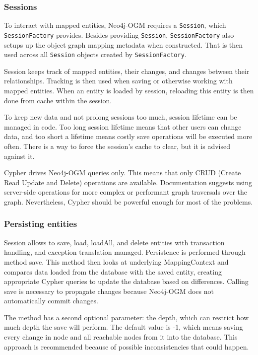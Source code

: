 \subsubsection{Sessions}
To interact with mapped entities, Neo4j-OGM requires a \texttt{Session}, which \texttt{SessionFactory} provides. Besides providing \texttt{Session}, \texttt{SessionFactory} also setups up the object graph mapping metadata when constructed. That is then used across all \texttt{Session} objects created by \texttt{SessionFactory}.

Session keeps track of mapped entities, their changes, and changes between their relationships. Tracking is then used when saving or otherwise working with mapped entities. When an entity is loaded by session, reloading this entity is then done from cache within the session.

To keep new data and not prolong sessions too much, session lifetime can be managed in code. Too long session lifetime means that other users can change data, and too short a lifetime means costly save operations will be executed more often. There is a way to force the session's cache to clear, but it is advised against it.

Cypher drives Neo4j-OGM queries only. This means that only CRUD (Create Read Update and Delete) operations are available. Documentation suggests using server-side operations for more complex or performant graph traversals over the graph. Nevertheless, Cypher should be powerful enough for most of the problems.

\subsubsection {Persisting entities}

Session allows to save, load, loadAll, and delete entities with transaction handling, and exception translation managed. Persistence is performed through method save. This method then looks at underlying MappingContext and compares data loaded from the database with the saved entity, creating appropriate Cypher queries to update the database based on differences. Calling save is necessary to propagate changes because Neo4j-OGM does not automatically commit changes.

The method has a second optional parameter: the depth, which can restrict how much depth the save will perform. The default value is -1, which means saving every change in node and all reachable nodes from it into the database. This approach is recommended because of possible inconsistencies that could happen.

